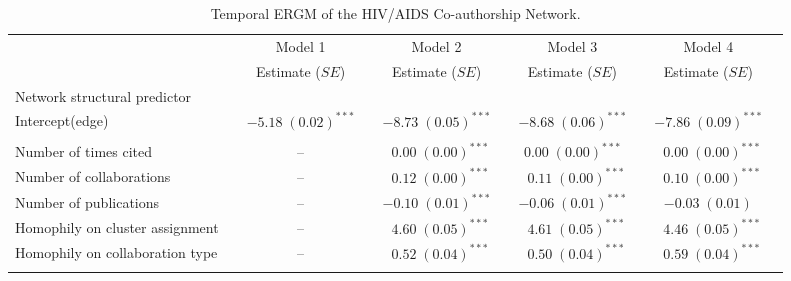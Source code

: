 \begin{table}
\begin{center}
\caption{Temporal ERGM of the HIV/AIDS Co-authorship Network.}
\label{tab:hiv_tergm}
\hspace*{-1cm}
\scriptsize
\begin{tabular}{@{}lcclclclcl@{}}
        \toprule
           &  & Model 1 &  & Model 2  &  & Model 3&  & Model 4\\ \cmidrule{3-3} \cmidrule{5-5} \cmidrule{7-7} \cmidrule{9-9}
           &  & Estimate ($SE$) &  & Estimate ($SE$)  &  & Estimate ($SE$) &  & Estimate ($SE$)\\
\midrule
Network structural predictor & & & & & & & & \\
\hspace{10pt}Intercept(edge)    &  & $-5.18 \; (0.02)^{***}$ &  & $-8.73 \; (0.05)^{***}$ &  & $-8.68 \; (0.06)^{***}$ &  & $-7.86 \; (0.09)^{***}$ \\\\
Number of times cited             &  &       --              &  & $\hspace{6pt}0.00 \; (0.00)^{***}$  &  & $0.00 \; (0.00)^{***}$  &  & $\hspace{6pt}0.00 \; (0.00)^{***}$  \\
Number of collaborations                 &  &         --            &  & $\hspace{6pt}0.12 \; (0.00)^{***}$  &  & $\hspace{6pt}0.11 \; (0.00)^{***}$  &  & $\hspace{6pt}0.10 \; (0.00)^{***}$  \\
Number of publications                 &  &            --         &  & $-0.10 \; (0.01)^{***}$ &  & $-0.06 \; (0.01)^{***}$ &  & $-0.03 \; (0.01)$       \\
Homophily on cluster assignment            &  &        --             &  & $\hspace{6pt}4.60 \; (0.05)^{***}$  &  & $\hspace{6pt}4.61 \; (0.05)^{***}$  &  & $\hspace{6pt}4.46 \; (0.05)^{***}$  \\
Homophily on collaboration type           &  &          --           &  & $\hspace{6pt}0.52 \; (0.04)^{***}$  &  & $\hspace{6pt}0.50 \; (0.04)^{***}$  &  & $\hspace{6pt}0.59 \; (0.04)^{***}$  \\\\

\end{tabular}
\end{center}
\end{table}
